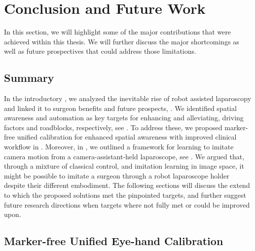 \chapter[Conclusions and Future Work]{Conclusion and Future Work}
\label{chap:conclusion}
\minitoc

\newpage

In this section, we will highlight some of the major contributions that were achieved within this thesis. We will further discuss the major shortcomings as well as future prospectives that could address those limitations. 

\section{Summary}
In the introductory , we analyzed the inevitable rise of robot assisted laparoscopy and linked it to surgeon benefits and future prospects, . We identified spatial awareness and automation as key targets for enhancing and alleviating, driving factors and roadblocks, respectively, see . To address these, we proposed marker-free unified calibration for enhanced spatial awareness with improved clinical workflow in . Moreover, in , we outlined a framework for learning to imitate camera motion from a camera-assistant-held laparoscope, see . We argued that, through a mixture of classical control, and imitation learning in image space, it might be possible to imitate a surgeon through a robot laparoscope holder despite their different embodiment. The following sections will discuss the extend to which the proposed solutions met the pinpointed targets, and further suggest future research directions when targets where not fully met or could be improved upon.

\section{Marker-free Unified Eye-hand Calibration}
\label{con:sec:marker_free}
